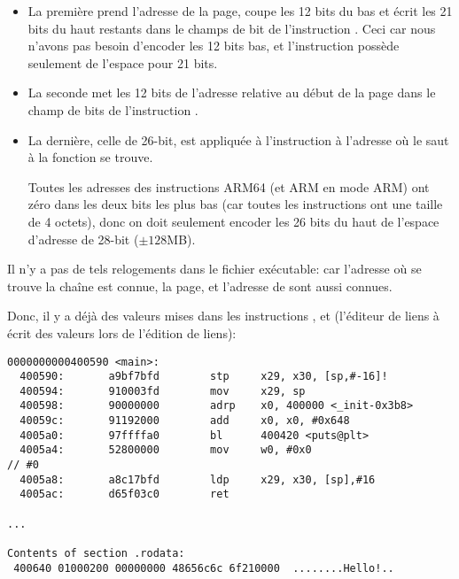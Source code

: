 \begin{itemize}
\item 
La première prend l'adresse de la page, coupe les 12 bits du bas et écrit les 21 bits
du haut restants dans le champs de bit de l'instruction . Ceci car nous n'avons
pas besoin d'encoder les 12 bits bas, et l'instruction  possède seulement
de l'espace pour 21 bits.

\item 
La seconde met les 12 bits de l'adresse relative au début de la page dans le champ
de bits de l'instruction \ADD.

\item 
La dernière, celle de 26-bit, est appliquée à l'instruction à l'adresse 
où le saut à la fonction \printf se trouve.

Toutes les adresses des instructions ARM64 (et ARM en mode ARM) ont zéro dans les
deux bits les plus bas (car toutes les instructions ont une taille de 4 octets),
donc on doit seulement encoder les 26 bits du haut de l'espace d'adresse de 28-bit
($\pm 128$MB).

\end{itemize}

Il n'y a pas de tels relogements dans le fichier exécutable: car l'adresse où se
trouve la chaîne  est connue, la page, et l'adresse de \puts sont aussi
connues.

Donc, il y a déjà des valeurs mises dans les instructions , \ADD et 
(l'éditeur de liens à écrit des valeurs lors de l'édition de liens):

\begin{lstlisting}[caption=objdump du fichier exécutable,style=customasmARM]
0000000000400590 <main>:
  400590:       a9bf7bfd        stp     x29, x30, [sp,#-16]!
  400594:       910003fd        mov     x29, sp
  400598:       90000000        adrp    x0, 400000 <_init-0x3b8>
  40059c:       91192000        add     x0, x0, #0x648
  4005a0:       97ffffa0        bl      400420 <puts@plt>
  4005a4:       52800000        mov     w0, #0x0                        // #0
  4005a8:       a8c17bfd        ldp     x29, x30, [sp],#16
  4005ac:       d65f03c0        ret

...

Contents of section .rodata:
 400640 01000200 00000000 48656c6c 6f210000  ........Hello!..
\end{lstlisting}


